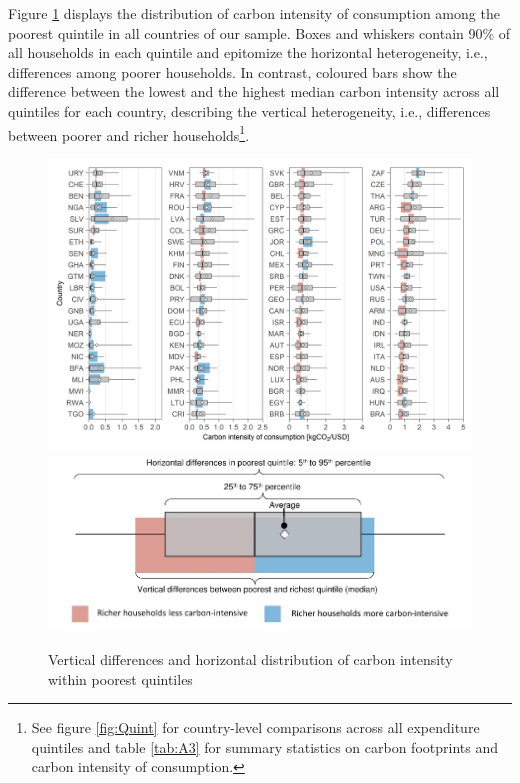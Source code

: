 \documentclass[12pt, a4paper]{article}
\newenvironment{subcaption2}
{\strut
\vspace{-5pt}
\begin{minipage}[b]{0.95\textwidth}
  \hspace*{-\parindent}
  \footnotesize}
 {\end{minipage}}
\begin{document}
Figure \ref{fig:fig_1} displays the distribution of carbon intensity of consumption among the poorest quintile in all countries of our sample. Boxes and whiskers contain 90\% of all households in each quintile and epitomize the horizontal heterogeneity, i.e., differences among poorer households. In contrast, coloured bars show the difference between the lowest and the highest median carbon intensity across all quintiles for each country, describing the vertical heterogeneity, i.e., differences between poorer and richer households\footnote{See figure \ref{fig:Quint} for country-level comparisons across all expenditure quintiles and table \ref{tab:A3} for summary statistics on carbon footprints and carbon intensity of consumption.}.

\begin{figure}[ht!]
    \centering
    \includegraphics{1_Figures/Figure 1/Figure_1_2017_11B.jpg}
    \includegraphics[scale=0.7]{1_Figures/Figure 1/Legend Figure 1.pdf}
    \caption{Vertical differences and horizontal distribution of carbon intensity within poorest quintiles}
    \label{fig:fig_1}
    \begin{subcaption2}

\end{subcaption2}
\end{figure}
\end{document}
